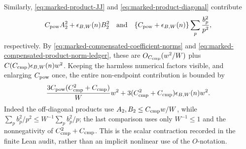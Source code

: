\documentclass[11pt]{article}
\numberwithin{equation}{section}
\theoremstyle{definition}
\theoremstyle{remark}
\newcommand{\1}{\mathbf 1}
\begin{document}
Similarly, \eqref{eq:marked-product-JJ} and
\eqref{eq:marked-product-diagonal} contribute
\[
 C_{\rm pow}A_2^2+\epsilon_{B,W}(n)B_2^2
 \quad\hbox{and}\quad
 \{C_{\rm pow}+\epsilon_{B,W}(n)\}
       \sum_p\frac{b_p^2}{p^2},
\]
respectively.  By
\eqref{eq:marked-compensated-coefficient-norms} and
\eqref{eq:marked-compensated-product-norm-ledger}, these are
\(O_{C_{\rm cmp}}(w^2/W)\) plus
\(C(C_{\rm cmp})\epsilon_{B,W}(n)w^2\).
Keeping the harmless numerical factors visible, and enlarging
\(C_{\rm pow}\) once, the entire non-endpoint contribution is bounded by
\begin{equation}
 \frac{3C_{\rm pow}(C_{\rm cmp}^2+C_{\rm cmp})}{W}w^2
 +3(C_{\rm cmp}^2+C_{\rm cmp})\epsilon_{B,W}(n)w^2.
 \label{eq:marked-compensated-nonendpoint-contraction}
\end{equation}
Indeed the off-diagonal products use \(A_2,B_2\le
C_{\rm cmp}w/W\), while
\(\sum_pb_p^2/p^2\le W^{-1}\sum_pb_p^2/p\); the last comparison uses
only \(W^{-1}\le1\) and the nonnegativity of
\(C_{\rm cmp}^2+C_{\rm cmp}\).  This is the scalar contraction recorded
in the finite Lean audit, rather than an implicit nonlinear use of the
\(O\)-notation.
\end{document}
